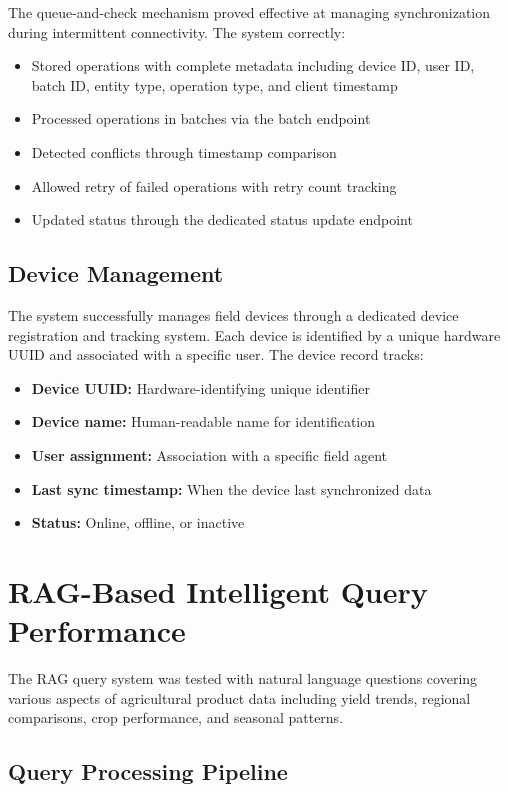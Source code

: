 The queue-and-check mechanism proved effective at managing synchronization during intermittent connectivity. The system correctly:
\begin{itemize}
  \item Stored operations with complete metadata including device ID, user ID, batch ID, entity type, operation type, and client timestamp
  \item Processed operations in batches via the batch endpoint
  \item Detected conflicts through timestamp comparison
  \item Allowed retry of failed operations with retry count tracking
  \item Updated status through the dedicated status update endpoint
\end{itemize}

\subsection{Device Management}

The system successfully manages field devices through a dedicated device registration and tracking system. Each device is identified by a unique hardware UUID and associated with a specific user. The device record tracks:
\begin{itemize}
  \item \textbf{Device UUID:} Hardware-identifying unique identifier
  \item \textbf{Device name:} Human-readable name for identification
  \item \textbf{User assignment:} Association with a specific field agent
  \item \textbf{Last sync timestamp:} When the device last synchronized data
  \item \textbf{Status:} Online, offline, or inactive
\end{itemize}

\section{RAG-Based Intelligent Query Performance}

The RAG query system was tested with natural language questions covering various aspects of agricultural product data including yield trends, regional comparisons, crop performance, and seasonal patterns.

\subsection{Query Processing Pipeline}


